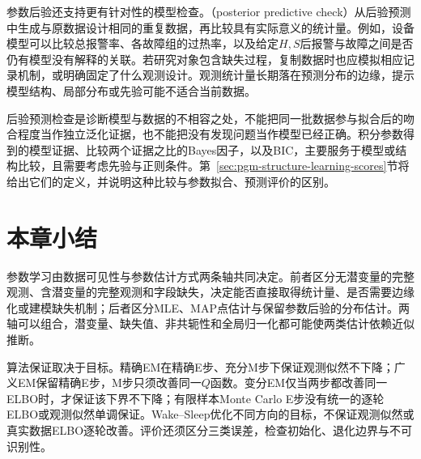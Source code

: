 参数后验还支持更有针对性的模型检查。（posterior predictive check）从后验预测中生成与原数据设计相同的重复数据，再比较具有实际意义的统计量。例如，设备模型可以比较总报警率、各故障组的过热率，以及给定$H,S$后报警与故障之间是否仍有模型没有解释的关联。若研究对象包含缺失过程，复制数据时也应模拟相应记录机制，或明确固定了什么观测设计。观测统计量长期落在预测分布的边缘，提示模型结构、局部分布或先验可能不适合当前数据。

后验预测检查是诊断模型与数据的不相容之处，不能把同一批数据参与拟合后的吻合程度当作独立泛化证据，也不能把没有发现问题当作模型已经正确。积分参数得到的模型证据、比较两个证据之比的Bayes因子，以及BIC，主要服务于模型或结构比较，且需要考虑先验与正则条件。第~\ref{sec:pgm-structure-learning-scores}节将给出它们的定义，并说明这种比较与参数拟合、预测评价的区别。

\section{本章小结}
\label{sec:pgm-parameter-learning-summary}

参数学习由数据可见性与参数估计方式两条轴共同决定。前者区分无潜变量的完整观测、含潜变量的完整观测和字段缺失，决定能否直接取得统计量、是否需要边缘化或建模缺失机制；后者区分MLE、MAP点估计与保留参数后验的分布估计。两轴可以组合，潜变量、缺失值、非共轭性和全局归一化都可能使两类估计依赖近似推断。

算法保证取决于目标。精确EM在精确E步、充分M步下保证观测似然不下降；广义EM保留精确E步，M步只须改善同一$Q$函数。变分EM仅当两步都改善同一ELBO时，才保证该下界不下降；有限样本Monte Carlo E步没有统一的逐轮ELBO或观测似然单调保证。Wake--Sleep优化不同方向的目标，不保证观测似然或真实数据ELBO逐轮改善。评价还须区分三类误差，检查初始化、退化边界与不可识别性。
